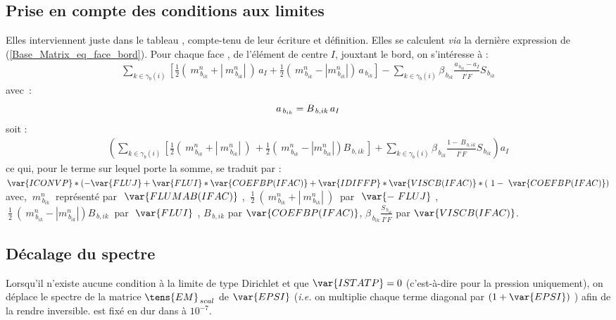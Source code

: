 \subsection*{\bf Prise en compte des conditions aux limites}
Elles interviennent juste dans le tableau , compte-tenu de leur
\'ecriture et d\'efinition. Elles se calculent {\it via} la derni\`ere
expression de (\ref{Base_Matrix_eq_face_bord}). Pour chaque face , de l'\'el\'ement
de centre $I$, jouxtant le bord, on s'int\'eresse \`a :
\begin{equation}
\begin{array}{ll}
\sum\limits_{k\in {\gamma_b(i)}}\left[\displaystyle\frac{1}{2}(\ m_{\,{b}_{ik}}^n + |\ m_{\,{b}_{ik}}^n|\ )\,a_I +
\displaystyle\frac{1}{2}(\ m_{\,{b}_{ik}}^n -
|m_{\,{b}_{ik}}^n|)\,a_{\,{b}_{ik}}\right] - \sum\limits_{k\in {\gamma_b(i)}}\displaystyle\beta_{\,b_{ik}}
\frac{a_{\,b_{ik}}- a_I}{\overline{I'F}} S_{\,b_{ik}}
\end{array}
\end{equation}
avec~:
\begin{equation}\notag
a_{\,{b}_{ik}} =  B_{\,b,ik}\,a_I\\
\end{equation}
soit :
\begin{equation}
\begin{array}{ll}
\left(\sum\limits_{k\in {\gamma_b(i)}}\left[\displaystyle\frac{1}{2}(\ m_{\,{b}_{ik}}^n + |\ m_{\,{b}_{ik}}^n|\ )\,+
\displaystyle\frac{1}{2}(\ m_{\,{b}_{ik}}^n -
|m_{\,{b}_{ik}}^n|)B_{\,b,ik}\,\right] + \sum\limits_{k\in {\gamma_b(i)}}\displaystyle\beta_{\,b_{ik}}
\frac{1 -\ B_{\,b,ik}}{\overline{I'F}} S_{\,b_{ik}}\right) a_I
\end{array}
\end{equation}
ce qui, pour le terme sur lequel porte la somme, se traduit par :\\
$\var{ICONVP} * (- \var{FLUJ} + \var{FLUI} * \var{COEFBP(IFAC)} + \var{IDIFFP} *
\var{VISCB(IFAC)} * (\ 1 -\ \var{COEFBP(IFAC)})$ \\ avec,
$\ m_{\,{b}_{ik}}^n\ $ repr\'esent\'e par $\ \var{FLUMAB(IFAC)}\ $,
$\ \displaystyle\frac{1}{2}\ (\
m_{\,{b}_{ik}}^n + |\ m_{\,{b}_{ik}}^n|\ )\ $ par $\ \var{-\ FLUJ}\ $,\\
$\ \displaystyle\frac{1}{2}\ (\ m_{\,{b}_{ik}}^n -
|m_{\,{b}_{ik}}^n|)B_{\,b,ik}\ $ par $\ \var{FLUI}\ $,
$B_{\,b,ik}$ par $\var{COEFBP(IFAC)}$, $\beta_{\,b_{ik}}\displaystyle\frac
{S_{\,b_{ik}}}{\overline{I'F}} $ par $\var{VISCB(IFAC)}$.\\
\subsection*{\bf D\'ecalage du spectre}
Lorsqu'il n'existe aucune condition \`a la limite de type Dirichlet et que
$\var{ISTATP} = 0 $ (c'est-\`a-dire pour la pression uniquement), on
d\'eplace le spectre de la matrice ${\tens{EM}}_{\,scal}$ de $$  ({\it i.e.} on multiplie chaque terme diagonal par $(1 + \var{EPSI})$ ) afin
de la rendre inversible. \var{EPSI} est fix\'e en dur dans \fort{matrix} \`a
 ${10}^{-7}$.
